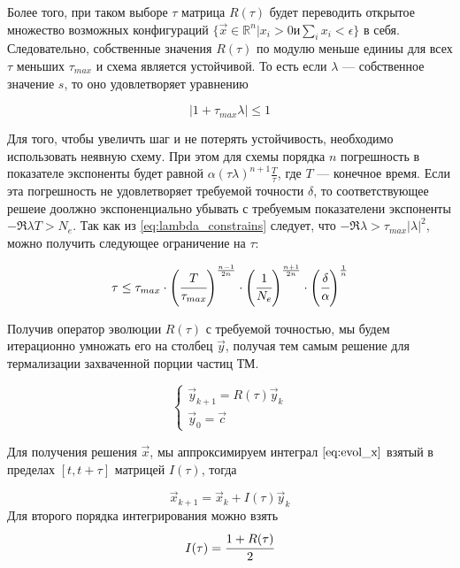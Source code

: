 Более того, при таком выборе $\tau$ матрица $R(\tau)$ будет переводить открытое множество возможных конфигураций
$\{\vec{x} \in \mathbb{R}^n | x_i > 0 и \sum_i{x_i} < \epsilon \}$ в себя. Следовательно, собственные значения $R(\tau)$ по модулю меньше единиы для всех $\tau$ меньших $\tau_{max}$ и схема является устойчивой. То есть если $\lambda$ --- собственное значение $s$, то оно удовлетворяет уравнению

\begin{equation}
	\label{eq:lambda_constrains}
	|1+\tau_{max}\lambda| \le 1
\end{equation}

Для того, чтобы увеличть шаг и не потерять устойчивость, необходимо использовать неявную схему. При этом для схемы порядка $n$ погрешность в показателе экспоненты будет равной $\alpha (\tau \lambda)^{n+1} \frac{T}{\tau}$, где $T$ --- конечное время. Если эта погрешность не удовлетворяет требуемой точности $\delta$, то соответствующее решеие доолжно экспоненциально убывать с требуемым показателени экспоненты $-\Re{\lambda} T > N_e$. Так как из \ref{eq:lambda_constrains} следует, что $-\Re{\lambda} > \tau_{max} |\lambda|^2$, можно получить следующее ограничение на $\tau$:

\begin{equation}
	\label{eq:tau_constrains}
	\tau \le \tau_{max}\cdot \left(\cfrac{T}{\tau_{max}}\right)^\frac{n-1}{2n}\cdot 
	\left(\cfrac{1}{N_e}\right)^{\frac{n+1}{2n}}\cdot  \left(\cfrac{\delta}{\alpha}\right)^{\frac{1}{n}}
\end{equation}

Получив оператор эволюции $R(\tau)$ с требуемой точностью, мы будем итерационно умножать его на столбец $\vec{y}$, получая тем самым решение для термализации захваченной порции частиц ТМ.

\begin{equation}
	\label{eq:solver_y}
	\begin{cases}
		\vec{y}_{k+1} = R(\tau) \vec{y}_k\\
		\vec{y}_0 = \vec{c}
	\end{cases}
\end{equation}

Для получения решения $\vec{x}$, мы аппроксимируем интеграл $\ref{eq:evol_x}$ взятый в пределах $[t,t+\tau]$ матрицей $I(\tau)$, тогда

\begin{equation}
	\label{eq:solver_x}
	\vec{x}_{k+1} = \vec{x}_{k} + I(\tau) \vec{y}_k
\end{equation}
Для второго порядка интегрирования можно взять
\begin{equation}
	\label{eq:I_tau}
	I(\tau) = \cfrac{1+R(\tau)}{2}
\end{equation}

